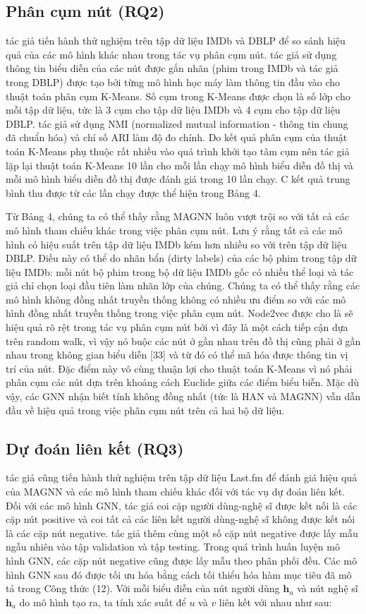 \subsection{Phân cụm nút (RQ2)}
tác giả tiến hành thử nghiệm trên tập dữ liệu IMDb và DBLP để so sánh hiệu quả của các mô hình khác nhau trong tác vụ phân cụm nút. tác giả sử dụng thông tin biểu diễn của các nút được gắn nhãn (phim trong IMDb và tác giả trong DBLP) được tạo bởi từng mô hình học máy làm thông tin đầu vào cho thuật toán phân cụm K-Means. Số cụm trong K-Means được chọn là số lớp cho mỗi tập dữ liệu, tức là 3 cụm cho tập dữ liệu IMDb và 4 cụm cho tập dữ liệu DBLP. tác giả sử dụng NMI (normalized mutual information - thông tin chung đã chuẩn hóa) và chỉ số ARI làm độ đo chính. Do kết quả phân cụm của thuật toán K-Means phụ thuộc rất nhiều vào quá trình khởi tạo tâm cụm nên tác giả lặp lại thuật toán K-Means 10 lần cho mỗi lần chạy mô hình biểu diễn đồ thị và mỗi mô hình biểu diễn đồ thị được đánh giá trong 10 lần chạy. C kết quả trung bình thu được từ các lần chạy được thể hiện trong Bảng 4.

Từ Bảng 4, chúng ta có thể thấy rằng MAGNN luôn vượt trội so với tất cả các mô hình tham chiếu khác trong việc phân cụm nút. Lưu ý rằng tất cả các mô hình có hiệu suất trên tập dữ liệu IMDb kém hơn nhiều so với trên tập dữ liệu DBLP. Điều này có thể do nhãn bẩn (dirty labels) của các bộ phim trong tập dữ liệu IMDb: mỗi nút bộ phim trong bộ dữ liệu IMDb gốc có nhiều thể loại và tác giả chỉ chọn loại đầu tiên làm nhãn lớp của chúng. Chúng ta có thể thấy rằng các mô hình không đồng nhất truyền thống không có nhiều ưu điểm so với các mô hình đồng nhất truyền thống trong việc phân cụm nút. Node2vec được cho là sẽ hiệu quả rõ rệt trong tác vụ phân cụm nút bởi vì đây là một cách tiếp cận dựa trên random walk, vì vậy nó buộc các nút ở gần nhau trên đồ thị cũng phải ở gần nhau trong không gian biểu diễn [33] và từ đó có thể mã hóa được thông tin vị trí của nút. Đặc điểm này vô cùng thuận lợi cho thuật toán K-Means vì nó phải phân cụm các nút dựa trên khoảng cách Euclide giữa các điểm biểu biễn. Mặc dù vậy, các GNN nhận biết tính không đồng nhất (tức là HAN và MAGNN) vẫn dẫn đầu về hiệu quả trong việc phân cụm nút trên cả hai bộ dữ liệu.

\subsection{Dự đoán liên kết (RQ3)}
tác giả cũng tiến hành thử nghiệm trên tập dữ liệu Last.fm để đánh giá hiệu quả của MAGNN và các mô hình tham chiếu khác đối với tác vụ dự đoán liên kết. Đối với các mô hình GNN, tác giả coi cặp người dùng-nghệ sĩ được kết nối là các cặp nút positive và coi tất cả các liên kết người dùng-nghệ sĩ không được kết nối là các cặp nút negative. tác giả thêm cùng một số cặp nút negative được lấy mẫu ngẫu nhiên vào tập validation và tập testing. Trong quá trình huấn luyện mô hình GNN, các cặp nút negative cũng được lấy mẫu theo phân phối đều. Các mô hình GNN sau đó được tối ưu hóa bằng cách tối thiểu hóa hàm mục tiêu đã mô tả trong Công thức (12). Với mỗi biểu diễn của nút người dùng $\mathbf{h}_{u}$ và nút nghệ sĩ $\mathbf{h}_{a}$ 
do mô hình tạo ra, ta tính xác suất để $u$ và $v$ liên kết với nhau như sau:

